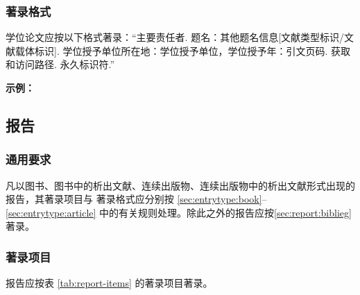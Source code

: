 \documentclass[twoside]{article}%
\begin{document}

\subsubsection{著录格式}

学位论文应按以下格式著录：“主要责任者. 题名：其他题名信息[文献类型标识/文献载体标识]. 学位授予单位所在地：学位授予单位，学位授予年：引文页码. 获取和访问路径. 永久标识符.”

\begin{refsection}

\nocite{王琦2022,gbt7714.8.7.2:2,gbt7714.8.7.2:3,CALMS1965--,CHRISTOU2024}%


\mbox{}{\small\textbf{示例：}\par}

{\printbibliography[heading=none,env=indentegenv]}
\end{refsection}


\subsection{报告}\label{sec:entrytype:report}

\subsubsection{通用要求}

凡以图书、图书中的析出文献、连续出版物、连续出版物中的析出文献形式出现的报告，其著录项目与
著录格式应分别按 \ref{sec:entrytype:book}--\ref{sec:entrytype:article} 中的有关规则处理。除此之外的报告应按\ref{sec:report:biblieg}著录。

\subsubsection{著录项目}

报告应按表 \ref{tab:report-items} 的著录项目著录。
\end{document}
